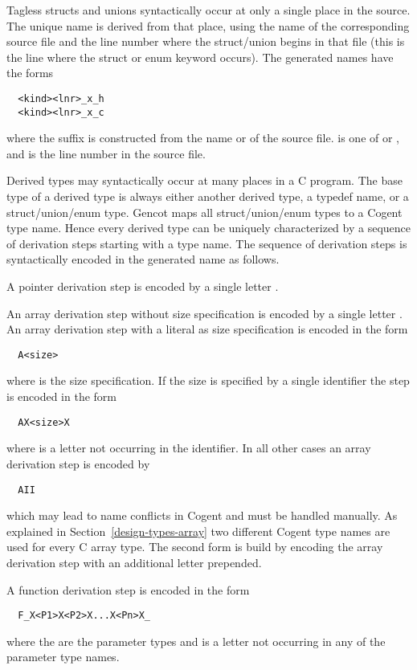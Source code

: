 Tagless structs and unions syntactically occur at only a single place in the source. The unique name is derived from 
that place, using the name of the corresponding source file and the line number where the struct/union begins
in that file (this is the line where the struct or enum keyword occurs).
The generated names have the forms
\begin{verbatim}
  <kind><lnr>_x_h
  <kind><lnr>_x_c
\end{verbatim}
where the suffix is constructed from the name  or  of the source file.  is one of
 or , and  is the line number in the source file.

Derived types may syntactically occur at many places in a C program. The base type of a derived
type is always either another derived type, a typedef name, or a struct/union/enum type. Gencot maps all
struct/union/enum types to a Cogent type name. Hence every derived type can be uniquely characterized by a sequence
of derivation steps starting with a type name. The sequence of derivation steps is syntactically encoded in the 
generated name as follows.

A pointer derivation step is encoded by a single letter . 

An array derivation step without size
specification is encoded by a single letter . An array derivation step with a literal
as size specification is encoded in the form
\begin{verbatim}
  A<size>
\end{verbatim}
where  is the size specification. If the size is specified by a single identifier the 
step is encoded in the form
\begin{verbatim}
  AX<size>X
\end{verbatim}
where  is a letter not occurring in the identifier.
In all other cases an array derivation step is encoded by
\begin{verbatim}
  AII
\end{verbatim}
which may lead to name conflicts in Cogent and must be handled manually. As explained in Section~\ref{design-types-array}
two different Cogent type names are used for every C array type. The second form is build by encoding 
the array derivation step with an additional letter  prepended.

A function derivation step is encoded in the form
\begin{verbatim}
  F_X<P1>X<P2>X...X<Pn>X_
\end{verbatim}
where the  are the parameter types and  is a letter not occurring in any of the parameter
type names. 

